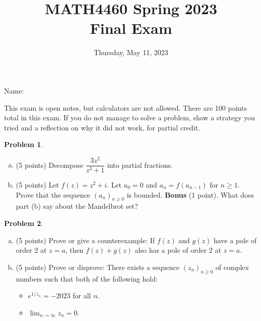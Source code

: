 \documentclass[11pt,oneside]{amsart}
\title{MATH4460 Spring 2023\\
Final Exam}
\author{Thursday, May 11, 2023}
\theoremstyle{definition}
\newtheorem{problem}{Problem}
\begin{document}
\maketitle

Name: \underline{\hspace{6cm}}

This exam is open notes, but calculators are not allowed. There are 100 points total in this exam. If you do not manage to solve a problem, show a strategy you tried and a reflection on why it did not work, for partial credit.

\begin{problem}
\leavevmode\begin{enumerate}[(a)]
  \item (5 points) Decompose $\dfrac{3z^2}{z^3+1}$ into partial fractions.
        \vfill
  \item (5 points) Let $f(z)=z^2+i$. Let $a_0=0$ and $a_n=f(a_{n-1})$ for $n\geq 1$. Prove that the sequence $(a_n)_{n\geq 0}$ is bounded.
        \vfill
        \textbf{Bonus} (1 point). What does part (b) say about the Mandelbrot set?
        \vspace{2cm}
\end{enumerate}
\end{problem}

\newpage

\begin{problem}
  \leavevmode\begin{enumerate}[(a)]
    \item (5 points) Prove or give a counterexample: If $f(z)$ and $g(z)$ have a pole of order 2 at $z=a$, then $f(z)+g(z)$ also has a pole of order 2 at $z=a$.
    \vfill
    \item (5 points) Prove or disprove: There exists a sequence $(z_n)_{n\geq 0}$ of complex numbers such that both of the following hold:
    \begin{itemize}
      \item $e^{1/z_n}=-2023$ for all $n$.
      \item $\lim_{n\to\infty}z_n=0$.
    \end{itemize}
    \vfill
  \end{enumerate}
\end{problem}
\end{document}

